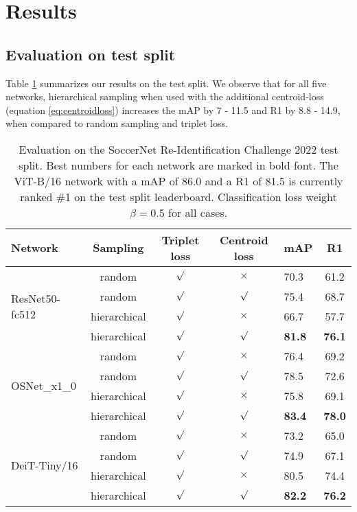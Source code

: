 \documentclass{article}
\begin{document}
\section{Results}
\label{sec:results}

\subsection{Evaluation on test split}

Table \ref{table:test_set_results} summarizes our results on the test split. We observe that for all five networks, hierarchical sampling when used with the additional centroid-loss (equation \ref{eq:centroidloss}) increases the mAP by 7 - 11.5 and R1 by 8.8 - 14.9, when compared to random sampling and triplet loss.

\begin{table}
  \caption{Evaluation on the SoccerNet Re-Identification Challenge 2022 test split. Best numbers for each network are marked in bold font. The ViT-B/16 network with a mAP of 86.0 and a R1 of 81.5 is currently ranked \#1 on the test split leaderboard. Classification loss weight $\beta = 0.5$ for all cases.}
  \label{table:test_set_results}
  \centering
  \begin{tabular}{@{}lccclc@{}}
    \toprule
Network & Sampling & Triplet loss & Centroid loss & mAP & R1 \\
    \midrule


    \multirow{4}{*}[-5pt]{ResNet50-fc512} & random & $\surd$ & $\times$ & 70.3 & 61.2\\
\addlinespace[0.5em]
    & random & $\surd$ & $\surd$ & 75.4 & 68.7 \\
\addlinespace[0.5em]
    & hierarchical & $\surd$ & $\times$ & 66.7 & 57.7\\
\addlinespace[0.5em]
    & hierarchical & $\surd$ & $\surd$ & \textbf{81.8} & \textbf{76.1}\\
    \midrule

    \multirow{4}{*}[-5pt]{OSNet\_x1\_0} & random & $\surd$ & $\times$ & 76.4 & 69.2 \\
\addlinespace[0.5em]
    & random & $\surd$ & $\surd$ & 78.5 & 72.6\\
\addlinespace[0.5em]
    & hierarchical & $\surd$ & $\times$ & 75.8 & 69.1\\
\addlinespace[0.5em]
    & hierarchical & $\surd$ & $\surd$ & \textbf{83.4} & \textbf{78.0}\\
    \midrule

    \multirow{4}{*}[-5pt]{DeiT-Tiny/16} & random & $\surd$ & $\times$ & 73.2 & 65.0\\
\addlinespace[0.5em]
    & random & $\surd$ & $\surd$ & 74.9 & 67.1\\
\addlinespace[0.5em]
    & hierarchical & $\surd$ & $\times$ & 80.5 & 74.4 \\
\addlinespace[0.5em]
    & hierarchical & $\surd$ & $\surd$ & \textbf{82.2} & \textbf{76.2}\\
    \midrule
    

\end{tabular}
\end{table}
\end{document}

